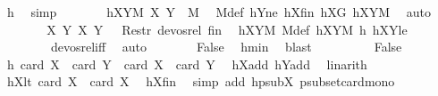 \begin{isabellebody}
\ h\ \isamarkupfalse%
\ simp\isanewline
\ \ \ \ \isamarkupfalse%
\ \isamarkupfalse%
\ hXY{}M{\isacharcolon}{\kern0pt}\ {\isachardoublequoteopen}{\isacharparenleft}{\kern0pt}{\isacharquery}{\kern0pt}X{}{\isacharcomma}{\kern0pt}\ {\isacharquery}{\kern0pt}Y{}{\isacharparenright}{\kern0pt}\ {\isasymin}\ M{\isachardoublequoteclose}\ \isamarkupfalse%
\ M{\isacharunderscore}{\kern0pt}def\ hY{}ne\ hX{}fin\ hX{}G\ hXYM\ \isamarkupfalse%
\ auto\isanewline
\ \ \ \ \isamarkupfalse%
\ \isamarkupfalse%
\ {\isachardoublequoteopen}{\isacharparenleft}{\kern0pt}{\isacharparenleft}{\kern0pt}{\isacharquery}{\kern0pt}X{}{\isacharcomma}{\kern0pt}\ {\isacharquery}{\kern0pt}Y{}{\isacharparenright}{\kern0pt}{\isacharcomma}{\kern0pt}\ {\isacharparenleft}{\kern0pt}X{\isacharcomma}{\kern0pt}\ Y{\isacharparenright}{\kern0pt}{\isacharparenright}{\kern0pt}\ {\isasymin}\ \ Restr\ devos{\isacharunderscore}{\kern0pt}rel\ {\isacharquery}{\kern0pt}fin{\isachardoublequoteclose}\ \isamarkupfalse%
\ hXYM\ M{\isacharunderscore}{\kern0pt}def\ hXY{}M\ h\ hXY{}le\ \isanewline
\ \ \ \ \ \ \ \ devos{\isacharunderscore}{\kern0pt}rel{\isacharunderscore}{\kern0pt}iff\ \isamarkupfalse%
\ auto\isanewline
\ \ \ \ \isamarkupfalse%
\ \isamarkupfalse%
\ False\ \isamarkupfalse%
\ hmin\ \isamarkupfalse%
\ blast\ \isanewline
\ \ \isamarkupfalse%
\isanewline
\ \ \ \ \isamarkupfalse%
\ False\isanewline
\ \ \ \ \isamarkupfalse%
\ \isamarkupfalse%
\ h{\isacharcolon}{\kern0pt}\ {\isachardoublequoteopen}card\ {\isacharquery}{\kern0pt}X{}\ {\isacharplus}{\kern0pt}\ card\ {\isacharquery}{\kern0pt}Y{}\ {\isasymge}\ card\ X\ {\isacharplus}{\kern0pt}\ card\ Y{\isachardoublequoteclose}\ \isamarkupfalse%
\ hXadd\ hYadd\ \isamarkupfalse%
\ linarith\isanewline
\ \ \ \ \isamarkupfalse%
\ hX{}lt{\isacharcolon}{\kern0pt}\ {\isachardoublequoteopen}card\ {\isacharquery}{\kern0pt}X{}\ {\isacharless}{\kern0pt}\ card\ X{\isachardoublequoteclose}\ \isamarkupfalse%
\ hXfin\ \isamarkupfalse%
\ {\isacharparenleft}{\kern0pt}simp\ add{\isacharcolon}{\kern0pt}\ hpsubX\ psubset{\isacharunderscore}{\kern0pt}card{\isacharunderscore}{\kern0pt}mono{\isacharparenright}{\kern0pt}\isanewline

\end{isabellebody}
